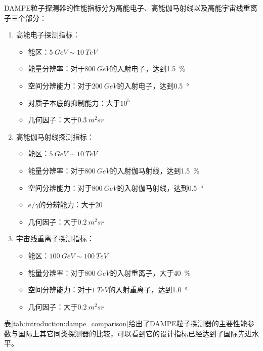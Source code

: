 DAMPE粒子探测器的性能指标分为高能电子、高能伽马射线以及高能宇宙线重离子三个部分：
\begin{enumerate}
	\item 高能电子探测指标：
	\begin{itemize}
		\item 能区：$\SI{5}{GeV}\sim \SI{10}{TeV}$
		\item 能量分辨率：对于$\SI{800}{GeV}$的入射电子，达到\SI{1.5}{\percent}
		\item 空间分辨能力：对于$\SI{200}{GeV}$的入射电子，达到\SI{0.5}{\degree}
		\item 对质子本底的抑制能力：大于$10^5$
		\item 几何因子：大于$\SI{0.3}{m^2sr}$
	\end{itemize}
	\item 高能伽马射线探测指标：
	\begin{itemize}
		\item 能区：$\SI{5}{GeV}\sim \SI{10}{TeV}$
		\item 能量分辨率：对于$\SI{800}{GeV}$的入射伽马射线，达到\SI{1.5}{\percent}
		\item 空间分辨能力：对于$\SI{800}{GeV}$的入射伽马射线，达到\SI{0.5}{\degree}
		\item $e/\gamma$的分辨能力：大于$20$
		\item 几何因子：大于$\SI{0.2}{m^2sr}$
	\end{itemize}
	\item 宇宙线重离子探测指标：
	\begin{itemize}
		\item 能区：$\SI{100}{GeV}\sim \SI{100}{TeV}$
		\item 能量分辨率：对于$\SI{800}{GeV}$的入射重离子，大于\SI{40}{\percent}
		\item 空间分辨能力：对于$\SI{1}{TeV}$的入射重离子，达到\SI{1.0}{\degree}
		\item 几何因子：大于$\SI{0.2}{m^2sr}$
	\end{itemize}
\end{enumerate}
表\ref{tab:introduction:dampe_comparison}给出了DAMPE粒子探测器的主要性能参数与国际上其它同类探测器的比较，可以看到它的设计指标已经达到了国际先进水平。

